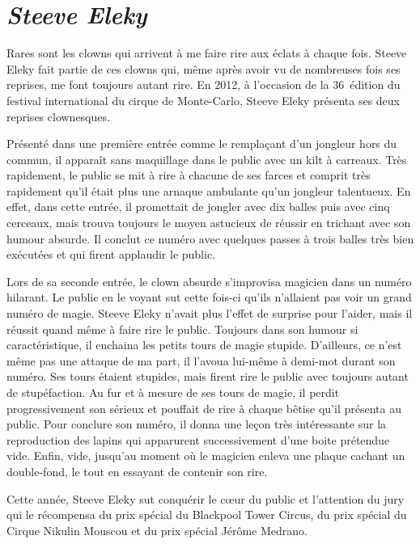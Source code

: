 \section*{\textit{Steeve Eleky}}
{}

Rares sont les clowns qui arrivent à me faire rire aux éclats à chaque fois. Steeve Eleky fait partie de ces clowns qui, même après avoir vu de nombreuses fois ses reprises, me font toujours autant rire. En 2012, à l’occasion de la 36\ieme~édition du festival international du cirque de Monte-Carlo, Steeve Eleky présenta ses deux reprises clownesques. 

Présenté dans une première entrée comme le remplaçant d’un jongleur hors du commun, il apparaît sans maquillage dans le public avec un kilt à carreaux. Très rapidement, le public se mit à rire à chacune de ses farces et comprit très rapidement qu’il était plus une arnaque ambulante qu’un jongleur talentueux. En effet, dans cette entrée, il promettait de jongler avec dix balles puis avec cinq cerceaux, mais trouva toujours le moyen astucieux de réussir en trichant avec son humour absurde. Il conclut ce numéro avec quelques passes à trois balles très bien exécutées et qui firent applaudir le public. 

Lors de sa seconde entrée, le clown absurde s’improvisa magicien dans un numéro hilarant. Le public en le voyant sut cette fois-ci qu'ils n’allaient pas voir un grand numéro de magie. Steeve Eleky n’avait plus l’effet de surprise pour l’aider, mais il réussit quand même à faire rire le public. Toujours dans son humour si caractéristique, il enchaina les petits tours de magie stupide. D’ailleurs, ce n’est même pas une attaque de ma part, il l’avoua lui-même à demi-mot durant son numéro. Ses tours étaient stupides, mais firent rire le public avec toujours autant de stupéfaction. Au fur et à mesure de ses tours de magie, il perdit progressivement son sérieux et pouffait de rire à chaque bêtise qu’il présenta au public. Pour conclure son numéro, il donna une leçon très intéressante sur la reproduction des lapins qui apparurent successivement d’une boite prétendue vide. Enfin, vide, jusqu’au moment où le magicien enleva une plaque cachant un double-fond, le tout en essayant de contenir son rire.

Cette année, Steeve Eleky sut conquérir le cœur du public et l’attention du jury qui le récompensa du prix spécial du Blackpool Tower Circus, du prix spécial du Cirque Nikulin Mouscou et du prix spécial Jérôme Medrano. 


\thispagestyle{empty} %

